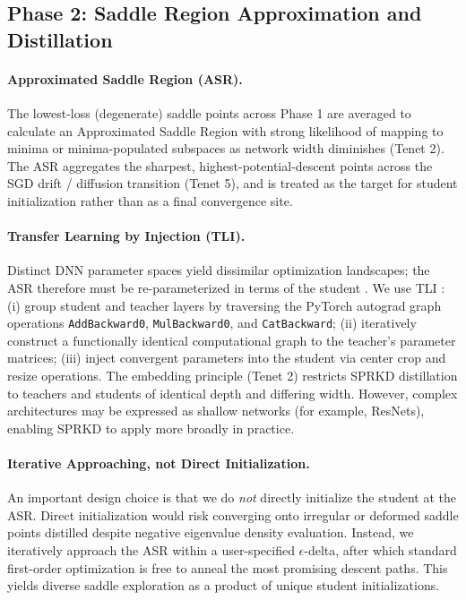 \documentclass[letterpaper]{article}
\begin{document}
\subsection{Phase 2: Saddle Region Approximation and Distillation}

\paragraph{Approximated Saddle Region (ASR).}
The lowest-loss (degenerate) saddle points across Phase 1 are averaged to calculate an Approximated Saddle Region with strong likelihood of mapping to minima or minima-populated subspaces as network width diminishes (Tenet 2). The ASR aggregates the sharpest, highest-potential-descent points across the SGD drift / diffusion transition (Tenet 5), and is treated as the target for student initialization rather than as a final convergence site.

\paragraph{Transfer Learning by Injection (TLI).}
Distinct DNN parameter spaces yield dissimilar optimization landscapes; the ASR therefore must be re-parameterized in terms of the student \citep{czyzewski2021weights}. We use TLI \citep{czyzewski2021weights}: (i) group student and teacher layers by traversing the PyTorch autograd graph operations \texttt{AddBackward0}, \texttt{MulBackward0}, and \texttt{CatBackward}; (ii) iteratively construct a functionally identical computational graph to the teacher's parameter matrices; (iii) inject convergent parameters into the student via center crop and resize operations. The embedding principle (Tenet 2) restricts SPRKD distillation to teachers and students of identical depth and differing width. However, complex architectures may be expressed as shallow networks (for example, ResNets), enabling SPRKD to apply more broadly in practice.

\paragraph{Iterative Approaching, not Direct Initialization.}
An important design choice is that we do \emph{not} directly initialize the student at the ASR. Direct initialization would risk converging onto irregular or deformed saddle points distilled despite negative eigenvalue density evaluation. Instead, we iteratively approach the ASR within a user-specified $\epsilon$-delta, after which standard first-order optimization is free to anneal the most promising descent paths. This yields diverse saddle exploration as a product of unique student initializations.
\end{document}
